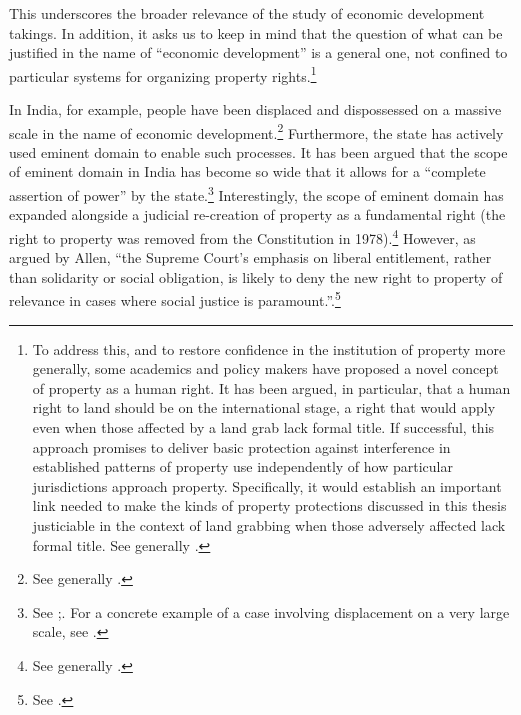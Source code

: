 This underscores the broader relevance of the study of economic development takings. In addition, it asks us to keep in mind that the question of what can be justified in the name of ``economic development'' is a general one, not confined to particular systems for organizing property rights.\footnote{To address this, and to restore confidence in the institution of property more generally, some academics and policy makers have proposed a novel concept of property as a human right. It has been argued, in particular, that a human right to land should be  on the international stage, a right that would apply even when those affected by a land grab lack formal title. If successful, this approach promises to deliver basic protection against interference in established patterns of property use independently of how particular jurisdictions approach property. Specifically, it would establish an important link needed to make the kinds of property protections discussed in this thesis justiciable in the context of land grabbing when those adversely affected lack formal title. See generally \cite{schutter10,schutter11,kunnerman13}.}

In India, for example, people have been displaced and dispossessed on a massive scale in the name of economic development.\footnote{See generally \cite{levien13}.} Furthermore, the state has actively used eminent domain to enable such processes. It has been argued that the scope of eminent domain in India has become so wide that it allows for a ``complete assertion of power'' by the state.\footnote{See \cite[43]{cullet09};\cite{usha09}. For a concrete example of a case involving displacement on a very large scale, see \cite{cullet01}.} Interestingly, the scope of eminent domain has expanded alongside a judicial re-creation of property as a fundamental right (the right to property was removed from the Constitution in 1978).\footnote{See generally \cite{allen15}.} However, as argued by Allen, ``the Supreme Court’s emphasis on liberal entitlement, rather than solidarity or social obligation, is likely to deny the new right to property of relevance in cases where social justice is paramount.''.\footnote{See \cite[30]{allen15}.}


